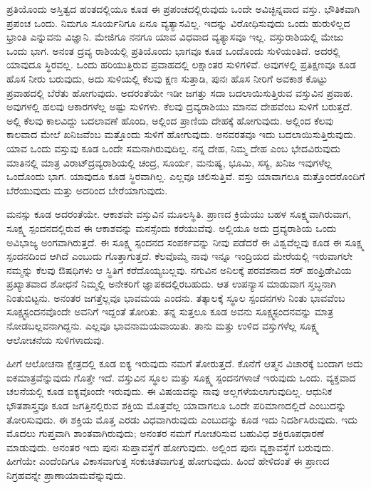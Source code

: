 \vskip 0.2cm

ಪ್ರತಿಯೊಂದು ಅಸ್ತಿತ್ವದ ಹಂತದಲ್ಲಿಯೂ ಕೂಡ ಈ ಪ್ರಪಂಚದಲ್ಲಿರುವುದು ಒಂದೇ ಅವಿಚ್ಛಿನ್ನವಾದ ವಸ್ತು. ಭೌತಿಕವಾಗಿ ಪ್ರಪಂಚ ಒಂದು. ನಿಮಗೂ ಸೂರ್ಯನಿಗೂ ಏನೂ ವ್ಯತ್ಯಾಸವಿಲ್ಲ. ಇದನ್ನು ವಿರೋಧಿಸುವುದು ಒಂದು ಹುರುಳಿಲ್ಲದ ಭ್ರಾಂತಿ ಎನ್ನುವನು ವಿಜ್ಞಾನಿ. ಮೇಜಿಗೂ ನನಗೂ ಯಾವ ವಿಧವಾದ ವ್ಯತ್ಯಾಸವೂ ಇಲ್ಲ. ವಸ್ತುರಾಶಿಯಲ್ಲಿ ಮೇಜು ಒಂದು ಭಾಗ. ಅನಂತ ದ್ರವ್ಯ ರಾಶಿಯಲ್ಲಿ ಪ್ರತಿಯೊಂದು ಭಾಗವೂ ಕೂಡ ಒಂದೊಂದು ಸುಳಿಯಂತಿದೆ. ಅದರಲ್ಲಿ ಯಾವುದೂ ಸ್ಥಿರವಲ್ಲ. ಒಂದು ಹರಿಯುತ್ತಿರುವ ಪ್ರವಾಹದಲ್ಲಿ ಲಕ್ಷಾಂತರ ಸುಳಿಗಳಿವೆ. ಅವುಗಳಲ್ಲಿ ಪ್ರತಿಕ್ಷಣವೂ ಕೂಡ ಹೊಸ ನೀರು ಬರುವುದು, ಅದು ಸುಳಿಯಲ್ಲಿ ಕೆಲವು ಕ್ಷಣ ಸುತ್ತಾಡಿ, ಪುನಃ ಹೊಸ ನೀರಿಗೆ ಅವಕಾಶ ಕೊಟ್ಟು ಪ್ರವಾಹದಲ್ಲಿ ಬೆರೆತು ಹೋಗುವುದು. ಅದರಂತೆಯೇ ಇಡೀ ಜಗತ್ತು ಸದಾ ಬದಲಾಯಿಸುತ್ತಿರುವ ವಸ್ತುವಿನ ಪ್ರವಾಹ. ಅವುಗಳಲ್ಲಿ ಹಲವು ಆಕಾರಗಳೆಲ್ಲ ಅಷ್ಟು ಸುಳಿಗಳು. ಕೆಲವು ದ್ರವ್ಯರಾಶಿಯು ಮಾನವ ದೇಹವೆಂಬ ಸುಳಿಗೆ ಬರುತ್ತದೆ. ಅಲ್ಲಿ ಕೆಲವು ಕಾಲವಿದ್ದು ಬದಲಾವಣೆ ಹೊಂದಿ, ಅಲ್ಲಿಂದ ಪ್ರಾಣಿಯ ದೇಹಕ್ಕೆ ಹೋಗುವುದು. ಅಲ್ಲಿಂದ ಕೆಲವು ಕಾಲವಾದ ಮೇಲೆ ಖನಿಜವೆಂಬ ಮತ್ತೊಂದು ಸುಳಿಗೆ ಹೋಗುವುದು. ಅನವರತವೂ ಇದು ಬದಲಾಯಿಸುತ್ತಿರುವುದು. ಯಾವ ಒಂದು ವಸ್ತುವು ಕೂಡ ಒಂದೇ ಸಮನಾಗಿರುವುದಿಲ್ಲ. ನನ್ನ ದೇಹ, ನಿಮ್ಮ ದೇಹ ಎಂಬ ಭೇದವಿರುವುದು ಮಾತಿನಲ್ಲಿ ಮಾತ್ರ ವಿರಾಟ್​ ದ್ರವ್ಯರಾಶಿಯಲ್ಲಿ ಚಂದ್ರ, ಸೂರ್ಯ, ಮನುಷ್ಯ, ಭೂಮಿ, ಸಸ್ಯ, ಖನಿಜ ಇವುಗಳೆಲ್ಲ ಒಂದೊಂದು ಭಾಗ. ಯಾವುದೂ ಕೂಡ ಸ್ಥಿರವಾಗಿಲ್ಲ. ಎಲ್ಲವೂ ಚಲಿಸುತ್ತಿವೆ. ವಸ್ತು ಯಾವಾಗಲೂ ಮತ್ತೊಂದರೊಂದಿಗೆ ಬೆರೆಯುವುದು ಮತ್ತು ಅದರಿಂದ ಬೇರೆಯಾಗುವುದು. 

\vskip 0.2cm

ಮನಸ್ಸು ಕೂಡ ಅದರಂತೆಯೇ. ಆಕಾಶವೇ ವಸ್ತುವಿನ ಮೂಲಸ್ಥಿತಿ. ಪ್ರಾಣದ ಕ್ರಿಯೆಯು ಬಹಳ ಸೂಕ್ಷ್ಮವಾಗಿರುವಾಗ, ಸೂಕ್ಷ್ಮ ಸ್ಪಂದನದಲ್ಲಿರುವ ಈ ಆಕಾಶವನ್ನು ಮನಸ್ಸೆಂದು ಕರೆಯುವೆವು. ಅಲ್ಲಿಯೂ ಅದು ದ್ರವ್ಯರಾಶಿಯ ಒಂದು ಅವಿಭಾಜ್ಯ ಅಂಗವಾಗಿರುತ್ತದೆ. ಈ ಸೂಕ್ಷ್ಮ ಸ್ಪಂದನದ ಸಂಪರ್ಕವನ್ನು ನೀವು ಪಡೆದರೆ ಈ ವಿಶ್ವವೆಲ್ಲವು ಕೂಡ ಈ ಸೂಕ್ಷ್ಮ ಸ್ಪಂದನದಿಂದ ಆಗಿದೆ ಎಂಬುದು ಗೊತ್ತಾಗುತ್ತದೆ. ಕೆಲವೊಮ್ಮೆ ನಾವು ಇನ್ನೂ ಇಂದ್ರಿಯದ ಮೇರೆಯಲ್ಲಿ ಇರುವಾಗಲೇ ನಮ್ಮನ್ನು ಕೆಲವು ಔಷಧಿಗಳು ಆ ಸ್ಥಿತಿಗೆ ಕರೆದೊಯ್ಯಬಲ್ಲವು. ನಗುವಿನ ಅನಿಲಕ್ಕೆ  ಪರವಶನಾದ ಸರ್​ ಹಂಫ್ರಿಡೇವಿಯ ಪ್ರಖ್ಯಾತವಾದ ಶೋಧನೆ ನಿಮ್ಮಲ್ಲಿ ಅನೇಕರಿಗೆ ಜ್ಞಾಪಕದಲ್ಲಿರಬಹುದು. ಆತ ಉಪನ್ಯಾಸ ಮಾಡುವಾಗ ಸ್ತಬ್ಧನಾಗಿ ನಿಂತುಬಿಟ್ಟನು. ಅನಂತರ ಜಗತ್ತೆಲ್ಲವೂ ಭಾವಮಯ ಎಂದನು. ತತ್ಕಾಲಕ್ಕೆ ಸ್ಥೂಲ ಸ್ಪಂದನಗಳು ನಿಂತು ಭಾವವೆಂಬ ಸೂಕ್ಷ್ಮಸ್ಪಂದನವೊಂದೇ ಅವನಿಗೆ ಇದ್ದಂತೆ ತೋರಿತು. ತನ್ನ ಸುತ್ತಲೂ ಕೂಡ ಅವನು ಸೂಕ್ಷ್ಮಸ್ಪಂದನವನ್ನು ಮಾತ್ರ ನೋಡಬಲ್ಲವನಾಗಿದ್ದನು. ಎಲ್ಲವೂ ಭಾವನಾಮಯವಾಯಿತು. ತಾನು ಮತ್ತು ಉಳಿದ ವಸ್ತುಗಳೆಲ್ಲ ಸೂಕ್ಷ್ಮ ಆಲೋಚನೆಯ ಸುಳಿಗಳಾದುವು. 

\vskip 0.2cm

ಹೀಗೆ ಆಲೋಚನಾ ಕ್ಷೇತ್ರದಲ್ಲಿ ಕೂಡ ಐಕ್ಯ ಇರುವುದು ನಮಗೆ ತೋರುತ್ತದೆ. ಕೊನೆಗೆ ಆತ್ಮನ ವಿಚಾರಕ್ಕೆ ಬಂದಾಗ ಅದು ಐಕಮಾತ್ರವೆನ್ನುವುದು ಗೊತ್ತೇ ಇದೆ. ವಸ್ತುವಿನ ಸ್ಥೂಲ ಮತ್ತು ಸೂಕ್ಷ್ಮ ಸ್ಪಂದನಗಳಾಚೆ ಇರುವುದು ಒಂದು. ವ್ಯಕ್ತವಾದ ಚಲನೆಯಲ್ಲಿ ಕೂಡ ಐಕ್ಯವೊಂದೇ ಇರುವುದು. ಈ ವಿಷಯವನ್ನು ನಾವು ಅಲ್ಲಗಳೆಯಲಾಗುವುದಿಲ್ಲ. ಆಧುನಿಕ ಭೌತಶಾಸ್ತ್ರವೂ ಕೂಡ ಜಗತ್ತಿನಲ್ಲಿರುವ ಶಕ್ತಿಯ ಮೊತ್ತವೆಲ್ಲ ಯಾವಾಗಲೂ ಒಂದೇ ಪರಿಮಾಣದಲ್ಲಿದೆ ಎಂಬುದನ್ನು ತೋರಿಸುವುದು. ಈ ಶಕ್ತಿಯ ಮೊತ್ತ ಎರಡು ವಿಧವಾಗಿರುವುದು ಎಂಬುದನ್ನು ಕೂಡ ಇದು ನಿದರ್ಶಿಸಿರುವುದು. ಇದು ಮೊದಲು ಗುಪ್ತವಾಗಿ ಶಾಂತವಾಗಿರುವುದು; ಅನಂತರ ನಮಗೆ ಗೋಚರಿಸುವ ಬಹುವಿಧ ಶಕ್ತಿರೂಪಧಾರಣೆ ಮಾಡುವುದು. ಅನಂತರ ಇದು ಪುನಃ ಸುಪ್ತಾವಸ್ಥೆಗೆ ಹೋಗುವುದು. ಅಲ್ಲಿಂದ ಪುನಃ ವ್ಯಕ್ತಾವಸ್ಥೆಗೆ ಬರುವುದು. ಹೀಗೆಯೇ ಎಂದೆಂದಿಗೂ ವಿಕಾಸವಾಗುತ್ತ ಸಂಕುಚಿತವಾಗುತ್ತ ಹೋಗುವುದು. ಹಿಂದೆ ಹೇಳಿದಂತೆ ಈ ಪ್ರಾಣದ ನಿಗ್ರಹವನ್ನೇ ಪ್ರಾಣಾಯಾಮವೆನ್ನುವುದು. 

